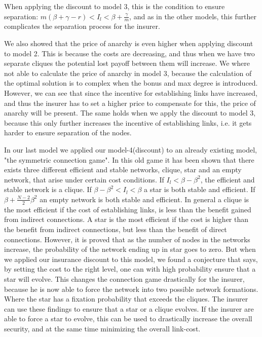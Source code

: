 When applying the discount to model 3, this is the condition to ensure separation: $m(\beta+\gamma-r)<I_{l}<\beta+\frac{\gamma}{m}$, and as in the other models, this further complicates the separation process for the insurer. 

We also showed that the price of anarchy is even higher when applying discount to model 2. This is because the costs are decreasing, and thus when we have two separate cliques the potential lost payoff between them will increase.
We where not able to calculate the price of anarchy in model 3, because the calculation of the optimal solution is to complex when the bonus and max degree is introduced. However, we can see that since the incentive for establishing links have increased, and thus the insurer has to set a higher price to compensate for this, the price of anarchy will be present. The same holds when we apply the discount to model 3, because this only further increases the incentive of establishing links, i.e. it gets harder to ensure separation of the nodes.  

In our last model we applied our model-4(discount) to an already existing model, "the symmetric connection game". In this old game it has been shown that there exists three different efficient and stable networks, clique, star and an empty network, that arise under certain cost conditions. If $I_{l}<\beta-\beta^{2}$, the efficient and stable network is a clique. If $\beta-\beta^{2}<I_{l}<\beta$ a star is both stable and efficient. If $\beta+\frac{N-2}{2}\beta^{2}$ an empty network is both stable and efficient. In general a clique is the most efficient if the cost of establishing links, is less than the benefit gained from indirect connections. A star is the most efficient if the cost is higher than the benefit from indirect connections, but less than the benefit of direct connections. 
However, it is proved that as the number of nodes in the networks increase, the probability of the network ending up in star goes to zero. But when we applied our insurance discount to this model, we found a conjecture that says, by setting the cost to the right level, one can with high probability ensure that a star will evolve. This changes the connection game drastically for the insurer, because he is now able to force the network into two possible network formations. Where the star has a fixation probability that exceeds the cliques. The insurer can use these findings to ensure that a star or a clique evolves. If the insurer are able to force a star to evolve, this can be used to drastically increase the overall security, and at the same time minimizing the overall link-cost. 


